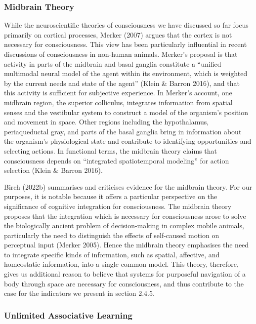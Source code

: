 \documentclass[12pt]{article}
\begin{document}
\subsubsection{Midbrain Theory}

While the neuroscientific theories of consciousness we have discussed so far focus primarily on cortical processes, Merker (2007) argues that the cortex is not necessary for consciousness. This view has been particularly influential in recent discussions of consciousness in non-human animals. Merker’s proposal is that activity in parts of the midbrain and basal ganglia constitute a ``unified multimodal neural model of the agent within its environment, which is weighted by the current needs and state of the agent'' (Klein \& Barron 2016), and that this activity is sufficient for subjective experience. In Merker’s account, one midbrain region, the superior colliculus, integrates information from spatial senses and the vestibular system to construct a model of the organism’s position and movement in space. Other regions including the hypothalamus, periaqueductal gray, and parts of the basal ganglia bring in information about the organism’s physiological state and contribute to identifying opportunities and selecting actions. In functional terms, the midbrain theory claims that consciousness depends on ``integrated spatiotemporal modeling'' for action selection (Klein \& Barron 2016).

Birch (2022b) summarises and criticises evidence for the midbrain theory. For our purposes, it is notable because it offers a particular perspective on the significance of cognitive integration for consciousness. The midbrain theory proposes that the integration which is necessary for consciousness arose to solve the biologically ancient problem of decision-making in complex mobile animals, particularly the need to distinguish the effects of self-caused motion on perceptual input (Merker 2005). Hence the midbrain theory emphasises the need to integrate specific kinds of information, such as spatial, affective, and homeostatic information, into a single common model. This theory, therefore, gives us additional reason to believe that systems for purposeful navigation of a body through space are necessary for consciousness, and thus contribute to the case for the indicators we present in section 2.4.5.

\subsubsection{Unlimited Associative Learning}
\end{document}
